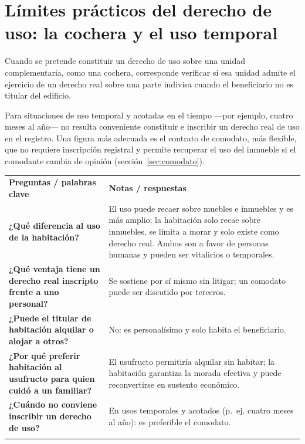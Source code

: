 \documentclass[12pt,oneside]{book}
\newcommand{\cq}[1]{\textbf{#1}}
\newcommand{\cornell}[3]{%
  \par\medskip\noindent\begingroup
  \renewcommand{\arraystretch}{1.25}%
  \begin{tabularx}{\textwidth}{|>{\raggedright\arraybackslash}p{0.27\textwidth}|>{\raggedright\arraybackslash}X|}
    \hline
    \multicolumn{2}{|>{\centering\arraybackslash}X|}{\cellcolor{azulacad!12}\textbf{Cuadro Cornell --- #1}}\\ \hline
    \cellcolor{gray!10}\textbf{Preguntas / palabras clave} & \cellcolor{gray!10}\textbf{Notas / respuestas} \\ \hline
    #2
    \multicolumn{2}{|>{\raggedright\arraybackslash}X|}{\cellcolor{azulacad!6}\textbf{Resumen.} #3}\\ \hline
  \end{tabularx}%
  \endgroup\par\medskip}
\begin{document}
\section{Límites prácticos del derecho de uso: la cochera y el uso temporal}

Cuando se pretende constituir un derecho de uso sobre una unidad complementaria, como una cochera, corresponde verificar si esa unidad admite el ejercicio de un derecho real sobre una parte indivisa cuando el beneficiario no es titular del edificio.

\begin{note}
Para situaciones de uso temporal y acotadas en el tiempo ---por ejemplo, cuatro meses al año--- no resulta conveniente constituir e inscribir un derecho real de uso en el registro. Una figura más adecuada es el contrato de comodato, más flexible, que no requiere inscripción registral y permite recuperar el uso del inmueble si el comodante cambia de opinión (sección~\ref{sec:comodato}).
\end{note}

\cornell{Los derechos de uso y de habitación}{
\cq{¿Qué diferencia al uso de la habitación?} & El uso puede recaer sobre muebles e inmuebles y es más amplio; la habitación solo recae sobre inmuebles, se limita a morar y solo existe como derecho real. Ambos son a favor de personas humanas y pueden ser vitalicios o temporales. \\ \hline
\cq{¿Qué ventaja tiene un derecho real inscripto frente a uno personal?} & Se sostiene por sí mismo sin litigar; un comodato puede ser discutido por terceros. \\ \hline
\cq{¿Puede el titular de habitación alquilar o alojar a otros?} & No: es personalísimo y solo habita el beneficiario. \\ \hline
\cq{¿Por qué preferir habitación al usufructo para quien cuidó a un familiar?} & El usufructo permitiría alquilar sin habitar; la habitación garantiza la morada efectiva y puede reconvertirse en sustento económico. \\ \hline
\cq{¿Cuándo no conviene inscribir un derecho de uso?} & En usos temporales y acotados (p.~ej. cuatro meses al año): es preferible el comodato. \\ \hline
}{El uso y la habitación protegen la vivienda de personas concretas con más solidez que un acuerdo personal. La habitación, personalísima y limitada a morar, es la figura precisa cuando solo debe habitar el beneficiario; el usufructo concede facultades mayores que a veces no se desean otorgar.}
\end{document}
